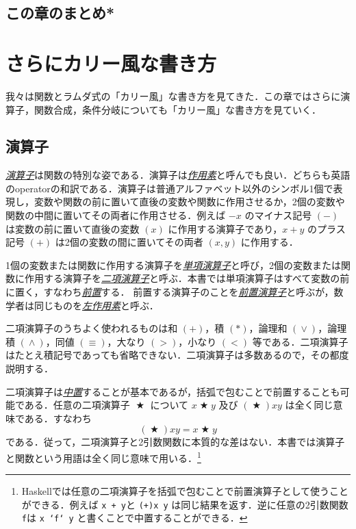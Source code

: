 \documentclass[a4paper]{jsbook}
\newcommand{\programminglanguage}[1]{\textsf{#1}}
\newcommand{\haskell}{\programminglanguage{Haskell}}
\newenvironment{leader}{\begingroup}{\endgroup}
\newcommand{\keyword}[1]{{\underline{\emph{#1}}}}
\newcommand{\code}[1]{\texttt{#1}}
\DeclareMathOperator{\mBinOp}{\bigstar}
\DeclareMathOperator{\mLogicalAnd}{\wedge}
\DeclareMathOperator{\mLogicalOr}{\vee}
\begin{document}
\section*{この章のまとめ*}


\chapter{さらにカリー風な書き方}

\begin{leader}
我々は関数とラムダ式の「カリー風」な書き方を見てきた．この章ではさらに演算子，関数合成，条件分岐についても「カリー風」な書き方を見ていく．
\end{leader}

\section{演算子}

\keyword{演算子}は関数の特別な姿である．演算子は\keyword{作用素}と呼んでも良い．どちらも英語のoperatorの和訳である．演算子は普通アルファベット以外のシンボル1個で表現し，変数や関数の前に置いて直後の変数や関数に作用させるか，2個の変数や関数の中間に置いてその両者に作用させる．例えば $-x$ のマイナス記号 $(-)$ は変数の前に置いて直後の変数 $(x)$ に作用する演算子であり，$x+y$ のプラス記号 $(+)$ は2個の変数の間に置いてその両者 $(x,y)$ に作用する．

1個の変数または関数に作用する演算子を\keyword{単項演算子}と呼び，2個の変数または関数に作用する演算子を\keyword{二項演算子}と呼ぶ．本書では単項演算子はすべて変数の前に置く，すなわち\keyword{前置}する．
前置する演算子のことを\keyword{前置演算子}と呼ぶが，数学者は同じものを\keyword{左作用素}と呼ぶ．

二項演算子のうちよく使われるものは和 $(+)$，積 $(*)$，論理和 $(\mLogicalOr)$，論理積 $(\mLogicalAnd)$，同値 $(\equiv)$，大なり $(>)$，小なり $(<)$ 等である．二項演算子はたとえ積記号であっても省略できない．二項演算子は多数あるので，その都度説明する．

二項演算子は\keyword{中置}することが基本であるが，括弧で包むことで前置することも可能である．任意の二項演算子 $\mBinOp$ について $x\mBinOp y$ 及び $(\mBinOp)xy$ は全く同じ意味である．すなわち
\begin{equation}
\left(\mBinOp\right)xy=x\mBinOp y
\end{equation}
である．従って，二項演算子と2引数関数に本質的な差はない．本書では演算子と関数という用語は全く同じ意味で用いる．\footnote{\haskell では任意の二項演算子を括弧で包むことで前置演算子として使うことができる．例えば \code{x + y}と \code{(+)x y} は同じ結果を返す．逆に任意の2引数関数 \code{f}は \code{x `f` y} と書くことで中置することができる．}
\end{document}
